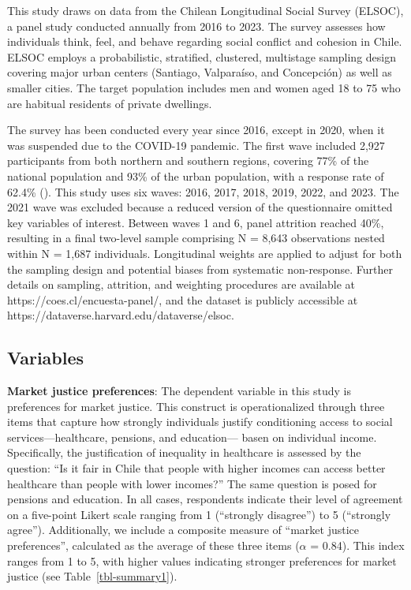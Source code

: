 \documentclass[
  12pt,
]{article}
\begin{document}
This study draws on data from the Chilean Longitudinal Social Survey
(ELSOC), a panel study conducted annually from 2016 to 2023. The survey
assesses how individuals think, feel, and behave regarding social
conflict and cohesion in Chile. ELSOC employs a probabilistic,
stratified, clustered, multistage sampling design covering major urban
centers (Santiago, Valparaíso, and Concepción) as well as smaller
cities. The target population includes men and women aged 18 to 75 who
are habitual residents of private dwellings.

The survey has been conducted every year since 2016, except in 2020,
when it was suspended due to the COVID-19 pandemic. The first wave
included 2,927 participants from both northern and southern regions,
covering 77\% of the national population and 93\% of the urban
population, with a response rate of 62.4\%
(). This study uses six
waves: 2016, 2017, 2018, 2019, 2022, and 2023. The 2021 wave was
excluded because a reduced version of the questionnaire omitted key
variables of interest. Between waves 1 and 6, panel attrition reached
40\%, resulting in a final two-level sample comprising N = 8,643
observations nested within N = 1,687 individuals. Longitudinal weights
are applied to adjust for both the sampling design and potential biases
from systematic non-response. Further details on sampling, attrition,
and weighting procedures are available at
https://coes.cl/encuesta-panel/, and the dataset is publicly accessible
at https://dataverse.harvard.edu/dataverse/elsoc.

\subsection{Variables}\label{variables}

\textbf{Market justice preferences}: The dependent variable in this
study is preferences for market justice. This construct is
operationalized through three items that capture how strongly
individuals justify conditioning access to social services---healthcare,
pensions, and education--- basen on individual income. Specifically, the
justification of inequality in healthcare is assessed by the question:
``Is it fair in Chile that people with higher incomes can access better
healthcare than people with lower incomes?'' The same question is posed
for pensions and education. In all cases, respondents indicate their
level of agreement on a five-point Likert scale ranging from 1
(``strongly disagree'') to 5 (``strongly agree''). Additionally, we
include a composite measure of ``market justice preferences'',
calculated as the average of these three items (\(\alpha\) = 0.84). This
index ranges from 1 to 5, with higher values indicating stronger
preferences for market justice (see Table~\ref{tbl-summary1}).
\end{document}
